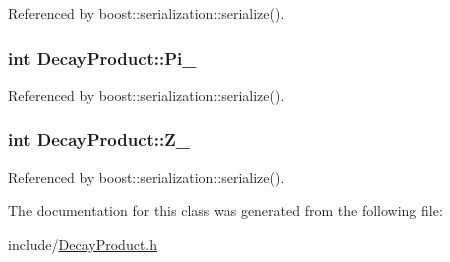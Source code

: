 Referenced by boost\-::serialization\-::serialize().

\hypertarget{classDecayProduct_a67f29a58426c136c7b7ac6e7afb1791e}{
\subsubsection[{Pi\-\_\-}]{\setlength{\rightskip}{0pt plus 5cm}int Decay\-Product\-::\-Pi\-\_\-}}\label{classDecayProduct_a67f29a58426c136c7b7ac6e7afb1791e}


Referenced by boost\-::serialization\-::serialize().

\hypertarget{classDecayProduct_a63c69c5515d18b7fa031623dbf70707f}{
\subsubsection[{Z\-\_\-}]{\setlength{\rightskip}{0pt plus 5cm}int Decay\-Product\-::\-Z\-\_\-}}\label{classDecayProduct_a63c69c5515d18b7fa031623dbf70707f}


Referenced by boost\-::serialization\-::serialize().



The documentation for this class was generated from the following file\-:\begin{DoxyCompactItemize}
\item 
include/\hyperlink{DecayProduct_8h}{Decay\-Product.\-h}\end{DoxyCompactItemize}
